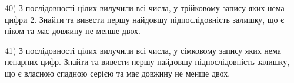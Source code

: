 \documentclass[11pt, ukrainian]{article}
\begin{document}
\par
\vspace{0.9cm}
40) \space 
З послідовності цілих вилучили всі числа, у трійковому запису яких нема цифри 2. Знайти та вивести першу найдовшу підпослідовність залишку, що є піком та має довжину не менше двох.

\par
\vspace{0.9cm}
41) \space 
З послідовності цілих вилучили всі числа, у сімковому запису яких нема непарних цифр. Знайти та вивести першу найдовшу підпослідовність залишку, що є власною спадною серією та має довжину не менше двох.

\par
\vspace{0.9cm}
\end{document}
